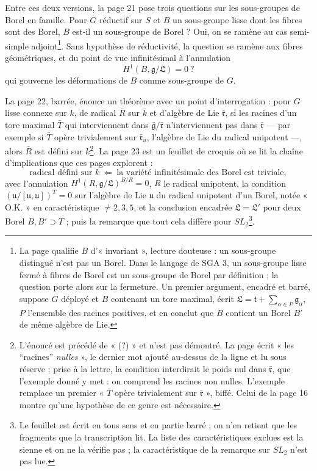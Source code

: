 \documentclass[11pt,a4paper]{article}
\begin{document}
Entre ces deux versions, la page 21 pose trois questions sur les sous-groupes
de Borel en famille. Pour $G$ réductif sur $S$ et $B$ un sous-groupe lisse dont
les fibres sont des Borel, $B$ est-il un sous-groupe de Borel ? Oui, on se
ramène au cas semi-simple adjoint\footnote{La page qualifie $B$
d'« invariant », lecture douteuse : un sous-groupe distingué n'est pas un Borel.
Dans le langage de SGA 3, un sous-groupe lisse fermé à fibres de Borel est un
sous-groupe de Borel par définition ; la question porte alors sur la
fermeture. Un premier argument, encadré et barré, suppose $G$ déployé et $B$
contenant un tore maximal, écrit
$\mathfrak{L} = \mathfrak{t} + \sum_{\alpha \in P} \mathfrak{g}_\alpha$, $P$
l'ensemble des racines positives, et en conclut que $B$ contient un Borel $B'$
de même algèbre de Lie.}. Sans
hypothèse de réductivité, la question se ramène aux fibres géométriques, et du
point de vue infinitésimal à l'annulation
\[
H^1(B, \mathfrak{g}/\mathfrak{L}) = 0 \ ?
\]
qui gouverne les déformations de $B$ comme sous-groupe de $G$.

La page 22, barrée, énonce un théorème avec un point d'interrogation : pour $G$
lisse connexe sur $k$, de radical $\bar R$ sur $\bar k$ et
d'algèbre de Lie $\bar{\mathfrak{r}}$, si les racines d'un tore maximal $\bar T$
qui interviennent dans $\bar{\mathfrak{g}}/\bar{\mathfrak{r}}$ n'interviennent pas
dans $\bar{\mathfrak{r}}$ — par exemple si $\bar T$ opère trivialement sur
$\bar{\mathfrak{r}}_u$, l'algèbre de Lie du radical unipotent —, alors $\bar R$
est défini sur $k$\footnote{L'énoncé est précédé de « (?) » et n'est pas
démontré. La page écrit « les “racines” \emph{nulles} », le dernier mot ajouté
au-dessus de la ligne et lu sous réserve ; prise à la lettre, la condition
interdirait le poids nul dans $\bar{\mathfrak{r}}$, que l'exemple donné y met :
on comprend les racines non nulles. L'exemple remplace un premier « $\bar T$
opère trivialement sur $\bar{\mathfrak{r}}$ », biffé. Celui de la page 16 montre
qu'une hypothèse de ce genre est nécessaire.}. La page 23 est un feuillet de croquis où se lit la chaîne
d'implications que ces pages explorent :
\[
\text{radical défini sur } k \ \Longleftarrow\
\text{la variété infinitésimale des Borel est triviale},
\]
avec l'annulation $H^1(R, \mathfrak{g}/\mathfrak{L})^{B/R} = 0$, $R$ le radical
unipotent, la condition $(\mathfrak{u}/[\mathfrak{u},\mathfrak{u}])^T = 0$ sur
l'algèbre de Lie $\mathfrak{u}$ du radical unipotent d'un Borel, notée « O.K. »
en caractéristique $\neq 2, 3, 5$, et la conclusion encadrée
$\mathfrak{L} = \mathfrak{L}'$ pour deux Borel $B, B' \supset T$ ; puis la
remarque que tout cela diffère pour $SL_2$\footnote{Le feuillet est écrit en tous
sens et en partie barré ; on n'en retient que les fragments que la transcription
lit. La liste des caractéristiques exclues est la sienne et on ne la vérifie
pas ; la caractéristique de la remarque sur $SL_2$ n'est pas lue.}.
\end{document}
